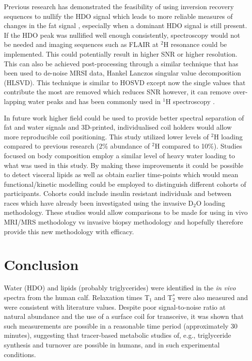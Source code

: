 \documentclass[class=article, crop=false]{standalone}
\begin{document}
Previous research has demonstrated the feasibility of using inversion recovery sequences to nullify the HDO signal which leads to more reliable measures of changes in the fat signal \cite{Brereton1989TheMice}, especially when a dominant HDO signal is still present. If the HDO peak was nullified well enough consistently, spectroscopy would not be needed and imaging sequences such as FLAIR at $^2$H resonance could be implemented. This could potentially result in higher SNR or higher resolution. This can also be achieved post-processing through a similar technique that has been used to de-noise MRSI data, Hankel Lanczos singular value decomposition (HLSVD). This technique is similar to HOSVD except now the single values that contribute the most are removed which reduces SNR however, it can remove over-lapping water peaks and has been commonly used in $^1$H spectroscopy \cite{Jansen20061HMetabolites, Cabanes2001OptimizationBrain}.

In future work higher field could be used to provide better spectral separation of fat and water signals and 3D-printed, individualised coil holders would allow more reproducible coil positioning. This study utilized lower levels of $^2$H loading compared to previous research (2\% abundance of $^2$H compared to 10\%). Studies focused on body composition employ a similar level of heavy water loading to what was used in this study. By making these improvements it could be possible to detect visceral lipids as well as obtain earlier time-points which would mean functional/kinetic modelling could be employed to distinguish different cohorts of participants. Cohorts could include insulin resistant individuals \cite{White2017AssociationHumans} and between races \cite{White2018RacialHumans} which have already been investigated using the invasive D$_2$O loading methodology. These studies would allow comparisons to be made for using in vivo MRI/MRS methodology vs invasive biopsy methodology and hopefully therefore provide this new methodology with efficacy.

\section{Conclusion}

Water (HDO) and lipids (probably triglycerides) were identified in the \textit{in vivo} spectra from the human calf. Relaxation times T$_1$ and T$_2^*$ were also measured and were consistent with literature values. Despite poor signal-to-noise ratio at natural abundance and the use of a surface coil for transceive, it was shown that such measurements are possible in a reasonable time period (approximately 30 minutes), suggesting that tracer-based metabolic studies of, e.g., triglyceride synthesis and turnover are possible in humans, and in such experimental conditions.  
\end{document}
